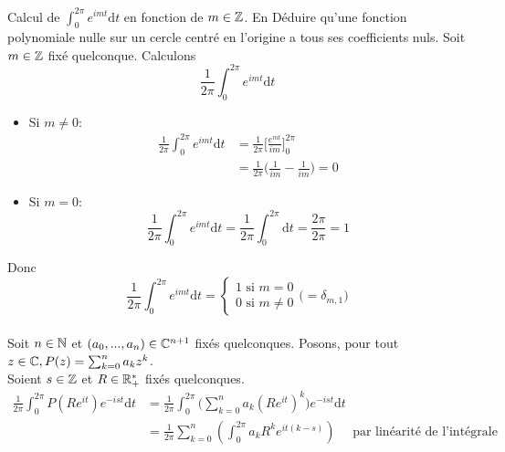 \documentclass{article}
\begin{document}
\pagebreak

\begin{question_kholle}{Calcul de $\displaystyle\int_0^{2\pi}e^{imt} \mathrm d t$ en fonction de $m \in \mathbb Z$. En Déduire qu'une fonction polynomiale nulle sur un cercle centré en l'origine a tous ses coefficients nuls.}
  Soit $m \in \mathbb Z$ fixé quelconque. Calculons
  $$\frac{1}{2 \pi} \int_0^{2\pi}e^{imt} \mathrm d t$$
  \begin{itemize}[label=$\star$]
    \item Si $m \neq 0$:
          \begin{align*}
            \frac{1}{2 \pi} \int_0^{2\pi}e^{imt} \mathrm d t & = \frac{1}{2 \pi} \Big[ \frac{e^{mt}}{im} \Big]_0^{2\pi}      \\
                                                             & = \frac{1}{2 \pi} \Big( \frac{1}{im} - \frac{1}{im} \Big) = 0
          \end{align*}
    \item Si $m = 0$:
          $$
            \frac{1}{2 \pi} \int_0^{2\pi}e^{imt} \mathrm d t = \frac{1}{2 \pi} \int_0^{2\pi} \mathrm d t = \frac{2 \pi}{2 \pi} = 1
          $$
  \end{itemize}
  Donc $$\frac{1}{2 \pi} \int_0^{2\pi}e^{imt} \mathrm d t =
    \begin{cases}
      1 \text{ si } m=0 \\
      0 \text{ si } m \neq 0
    \end{cases}
    \bigl(= \delta_{m, 1}\bigr)
  $$
  \\
  Soit $n\in \mathbb N$ et $(a_0, ..., a_n) \in \mathbb C^{n+1}$ fixés quelconques. Posons, pour tout $z\in\mathbb C, P(z) = \sum_{k=0}^n a_k z^k$.\\
  Soient $s\in\mathbb Z$ et $R\in\mathbb R_+^*$ fixés quelconques.
  \begin{align*}
    \frac{1}{2 \pi} \int_0^{2\pi} P(Re^{it}) e^{-ist} \mathrm d t & = \frac{1}{2 \pi} \int_0^{2\pi} \bigg (\sum_{k=0}^n a_k (Re^{it})^k \bigg) e^{-ist} \mathrm d t                                                                                                                                                                                                                                                     \\
                                                                  & = \frac{1}{2\pi}\sum_{k=0}^{n}\left(\int_{0}^{2\pi}a_kR^ke^{it(k-s)}\right)                                                                                                                                                                                                                               \quad\text{ par linéarité de l'intégrale} \\

\end{align*}
\end{question_kholle}
\end{document}
